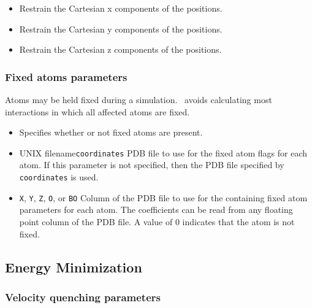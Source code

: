 \begin{itemize}
\item
{}
{Restrain the Cartesian x components of the positions.}
\item
{}
{Restrain the Cartesian y components of the positions.}
\item
{}
{Restrain the Cartesian z components of the positions.}

\end{itemize}

\subsubsection{Fixed atoms parameters}

Atoms may be held fixed during a simulation.  \NAMD\ avoids calculating most interactions in which all affected atoms are fixed.

\begin{itemize}

\item
{}
{Specifies whether or not fixed atoms are present.} 

\item
{}
{UNIX filename}{{\tt coordinates}}
{PDB file to use for the fixed atom flags for each atom.  
If this parameter is not specified, then 
the PDB file specified by {\tt coordinates} is used.}

\item
{}
{{\tt X}, {\tt Y}, {\tt Z}, {\tt O}, or {\tt B}}{{\tt O}} 
{Column of the PDB file to use for the containing fixed atom parameters for 
each atom.  The coefficients can be read from any 
floating point column of the PDB file.  
A value of 0 indicates that the atom is not fixed.}

\end{itemize}

\subsection{Energy Minimization}

\subsubsection{Velocity quenching parameters}

